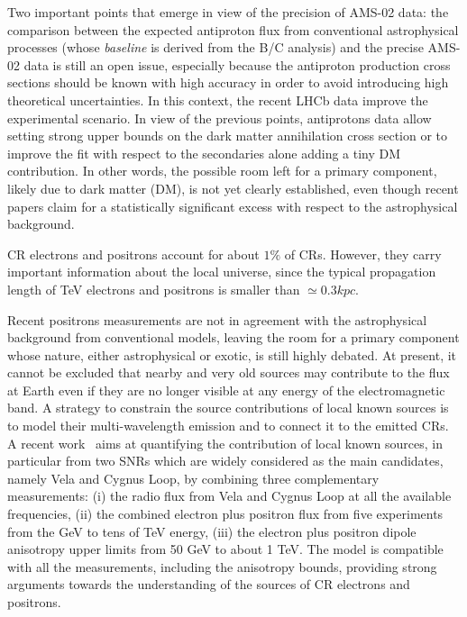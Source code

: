 \documentclass{PoS}
\begin{document}
Two important points that emerge in view of the precision of AMS-02 data: the comparison between the expected antiproton flux from conventional astrophysical processes (whose \textit{baseline} is derived from the B/C analysis) and the precise AMS-02 data is still an open issue, especially because the antiproton production cross sections should be known with high accuracy in order to avoid introducing high theoretical uncertainties. 
In this context, the recent  LHCb data improve the experimental scenario. In view of the previous points, antiprotons data allow setting strong upper bounds on the dark matter annihilation cross section or to improve the fit with respect to the secondaries 
alone adding a tiny DM contribution. In other words, the possible room left for a primary component, likely due to dark matter (DM), is not yet clearly established, even though recent papers claim for a statistically significant excess with respect to the astrophysical background. 

CR electrons and positrons account for about $1\%$ of CRs. However, they carry important information about the
local universe, since the typical propagation length of TeV electrons and positrons is smaller than $\simeq 0.3 kpc$. 

Recent positrons measurements are not in agreement with the astrophysical background from conventional models, leaving the room for a primary component whose nature, either astrophysical or exotic, is still highly debated. At present, it cannot be excluded that nearby and
very old sources may contribute to the flux at Earth even if they are no longer visible at any
energy of the electromagnetic band. A strategy to constrain the source contributions of local
known sources is to model their multi-wavelength emission and to connect it to the emitted
CRs. A recent work~\cite{Manconi:2018azw} aims at  quantifying the contribution of local known
sources, in particular from two SNRs which are widely considered as the main candidates, namely Vela and Cygnus Loop, by combining three complementary measurements: (i) the radio flux from Vela and Cygnus Loop at all the available frequencies, (ii) the combined electron plus positron flux from five experiments from the GeV to tens of TeV energy, (iii) the electron plus positron dipole anisotropy upper limits from 50 GeV to about 1 TeV. 
The model is compatible with all the measurements, including the anisotropy bounds, providing strong arguments towards the understanding of the sources of CR electrons and positrons. 
\end{document}
